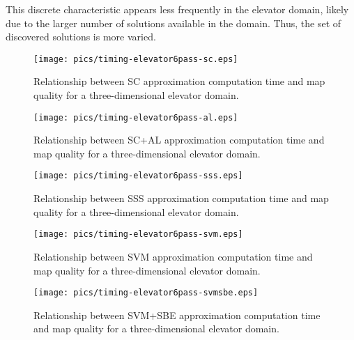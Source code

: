 This discrete characteristic appears less frequently in the elevator domain, likely due to the larger number of solutions available in the domain.  Thus, the set of discovered solutions  is more varied.

\begin{figure}
\begin{center}
\texttt{[image: pics/timing-elevator6pass-sc.eps]}
\caption{Relationship between SC approximation computation time and map quality for a three-dimensional elevator domain.}
\label{fig:timing-elevator6pass-sc}
\end{center}
\end{figure}

\begin{figure}
\begin{center}
\texttt{[image: pics/timing-elevator6pass-al.eps]}
\caption{Relationship between SC+AL approximation computation time and map quality for a three-dimensional elevator domain.}
\label{fig:timing-elevator6pass-al}
\end{center}
\end{figure}

\begin{figure}
\begin{center}
\texttt{[image: pics/timing-elevator6pass-sss.eps]}
\caption{Relationship between SSS approximation computation time and map quality for a three-dimensional elevator domain.}
\label{fig:timing-elevator6pass-sss}
\end{center}
\end{figure}

\begin{figure}
\begin{center}
\texttt{[image: pics/timing-elevator6pass-svm.eps]}
\caption{Relationship between SVM approximation computation time and map quality for a three-dimensional elevator domain.}
\label{fig:timing-elevator6pass-svm}
\end{center}
\end{figure}

\begin{figure}
\begin{center}
\texttt{[image: pics/timing-elevator6pass-svmsbe.eps]}
\caption{Relationship between SVM+SBE approximation computation time and map quality for a three-dimensional elevator domain.}
\label{fig:timing-elevator6pass-svmsbe}
\end{center}
\end{figure}

